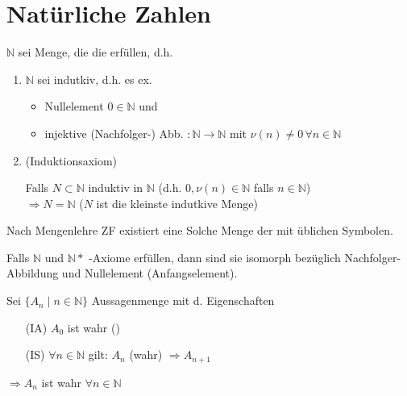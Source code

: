 \addtocounter{section}{1} %
\section{Natürliche Zahlen}
\begin{definition}
$\mathbb{N}$ sei Menge, die die  erfüllen, d.h.
\begin{enumerate}[label={P\arabic*)}]
	\item $\mathbb{N}$ sei indutkiv, d.h. es ex.
	\begin{itemize}
		\item Nullelement $0\in \mathbb{N}$ und
		\item injektive (Nachfolger-) Abb. $:\mathbb{N}\rightarrow\mathbb{N}$ mit $\nu(n)\neq 0\,\forall n\in \mathbb{N}$
	\end{itemize}
	\item (Induktionsaxiom)
	
	Falls $N\subset\mathbb{N}$ induktiv in $\mathbb{N}$ (d.h. $0,\nu(n)\in\mathbb{N}$ falls $n\in\mathbb{N}$)\\
	$\Rightarrow N=\mathbb{N}$ ($N$ ist die kleinste indutkive Menge)
\end{enumerate}

Nach Mengenlehre ZF existiert eine Solche Menge der  mit üblichen Symbolen.
\end{definition}

\begin{theorem}
	Falls $\mathbb{N}$ und $\mathbb{N}*$ -Axiome erfüllen, dann sind sie isomorph bezüglich Nachfolger-Abbildung und Nullelement (Anfangselement).
\end{theorem}

\begin{proposition} 
	Sei $\{A_n \mid n\in\mathbb{N}\}$ Aussagenmenge mit d. Eigenschaften
	\begin{itemize}
		\item[(IA)] $A_0$ ist wahr ()
		\item[(IS)] $\forall n\in\mathbb{N}$ gilt: $A_n$ (wahr) $\Rightarrow A_{n+1}$
	\end{itemize}
	$\Rightarrow A_n$ ist wahr $\forall n\in\mathbb{N}$
\end{proposition}

